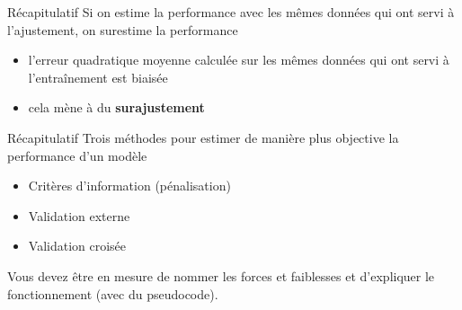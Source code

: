 \documentclass[
  ignorenonframetext,
]{beamer}
\providecommand{\tightlist}{%
  \setlength{\itemsep}{0pt}\setlength{\parskip}{0pt}}\usepackage{longtable,booktabs,array}
\begin{document}
\begin{frame}{Récapitulatif}
\label{ruxe9capitulatif-1}
Si on estime la performance avec les mêmes données qui ont servi à
l'ajustement, on surestime la performance

\begin{itemize}
\tightlist
\item
  l'erreur quadratique moyenne calculée sur les mêmes données qui ont
  servi à l'entraînement est biaisée
\item
  cela mène à du \textbf{surajustement}
\end{itemize}
\end{frame}

\begin{frame}{Récapitulatif}
\label{ruxe9capitulatif-2}
Trois méthodes pour estimer de manière plus objective la performance
d'un modèle

\begin{itemize}
\tightlist
\item
  Critères d'information (pénalisation)
\item
  Validation externe
\item
  Validation croisée
\end{itemize}

\footnotesize

Vous devez être en mesure de nommer les forces et faiblesses et
d'expliquer le fonctionnement (avec du pseudocode).
\end{frame}
\end{document}
